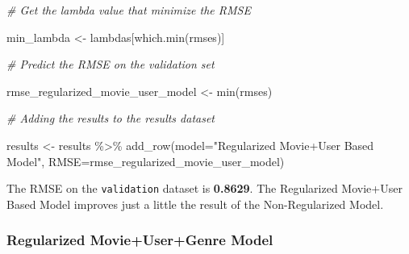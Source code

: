 \documentclass[
]{article}
\newenvironment{Shaded}{}{}
\newcommand{\AttributeTok}[1]{\textcolor[rgb]{0.49,0.56,0.16}{#1}}
\newcommand{\CommentTok}[1]{\textcolor[rgb]{0.38,0.63,0.69}{\textit{#1}}}
\newcommand{\FunctionTok}[1]{\textcolor[rgb]{0.02,0.16,0.49}{#1}}
\newcommand{\NormalTok}[1]{#1}
\newcommand{\OtherTok}[1]{\textcolor[rgb]{0.00,0.44,0.13}{#1}}
\newcommand{\SpecialCharTok}[1]{\textcolor[rgb]{0.25,0.44,0.63}{#1}}
\newcommand{\StringTok}[1]{\textcolor[rgb]{0.25,0.44,0.63}{#1}}
\begin{document}
\begin{Shaded}
\begin{Highlighting}[]
\CommentTok{\# Get the lambda value that minimize the RMSE}

\NormalTok{min\_lambda }\OtherTok{\textless{}{-}}\NormalTok{ lambdas[}\FunctionTok{which.min}\NormalTok{(rmses)]}

\CommentTok{\# Predict the RMSE on the validation set}

\NormalTok{rmse\_regularized\_movie\_user\_model }\OtherTok{\textless{}{-}} \FunctionTok{min}\NormalTok{(rmses)}

\CommentTok{\# Adding the results to the results dataset}

\NormalTok{results }\OtherTok{\textless{}{-}}\NormalTok{ results }\SpecialCharTok{\%\textgreater{}\%} \FunctionTok{add\_row}\NormalTok{(}\AttributeTok{model=}\StringTok{"Regularized Movie+User Based Model"}\NormalTok{, }\AttributeTok{RMSE=}\NormalTok{rmse\_regularized\_movie\_user\_model)}
\end{Highlighting}
\end{Shaded}

The RMSE on the \texttt{validation} dataset is \textbf{0.8629}. The
Regularized Movie+User Based Model improves just a little the result of
the Non-Regularized Model.

\hypertarget{regularized-movieusergenre-model}{%
\subsubsection{Regularized Movie+User+Genre
Model}\label{regularized-movieusergenre-model}}
\end{document}
